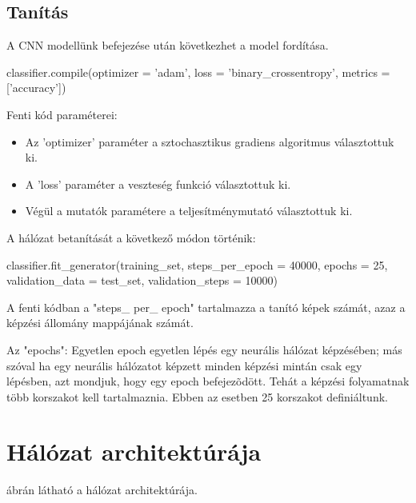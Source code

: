 \subsection{Tanítás}

A CNN modellünk befejezése után következhet a model fordítása.

\begin{python}
classifier.compile(optimizer = 'adam', loss = 'binary_crossentropy',
metrics = ['accuracy'])
\end{python}

Fenti kód paraméterei:
\begin{itemize}
\item Az 'optimizer' paraméter a sztochasztikus gradiens algoritmus választottuk ki.
\item A 'loss' paraméter a veszteség funkció választottuk ki.
\item Végül a mutatók paramétere a teljesítménymutató választottuk ki.
\end{itemize}

A hálózat betanítását a következő módon történik:

\begin{python}
classifier.fit_generator(training_set,
steps_per_epoch = 40000,
epochs = 25,
validation_data = test_set,
validation_steps = 10000)
\end{python}

A fenti kódban a "steps\_ per\_ epoch" tartalmazza a tanító képek számát, azaz a képzési állomány mappájának számát.

Az "epochs": Egyetlen epoch egyetlen lépés egy neurális hálózat képzésében; más szóval ha egy neurális hálózatot képzett minden képzési mintán csak egy lépésben, azt mondjuk, hogy egy epoch befejezõdött. Tehát a képzési folyamatnak több korszakot kell tartalmaznia. Ebben az esetben 25 korszakot definiáltunk.

\section{Hálózat architektúrája}

 ábrán látható a hálózat architektúrája.

